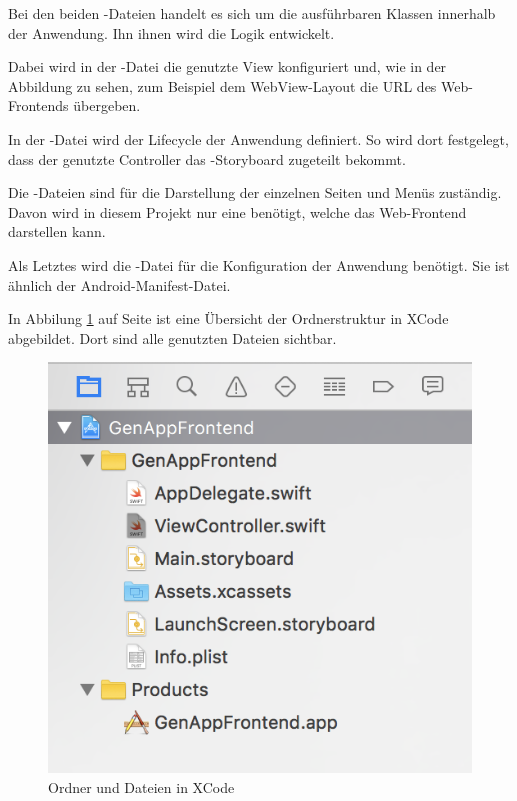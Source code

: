 Bei den beiden -Dateien handelt es sich um die ausführbaren Klassen innerhalb der Anwendung. Ihn ihnen wird
die Logik entwickelt.

Dabei wird in der -Datei die genutzte View konfiguriert und, wie in der Abbildung zu sehen, zum
Beispiel dem WebView-Layout die URL des Web-Frontends übergeben.

In der -Datei wird der Lifecycle der Anwendung definiert. So wird dort festgelegt, dass der genutzte
Controller das -Storyboard zugeteilt bekommt.

Die -Dateien sind für die Darstellung der einzelnen Seiten und Menüs zuständig. Davon wird in diesem
Projekt nur eine benötigt, welche das Web-Frontend darstellen kann.

Als Letztes wird die -Datei für die Konfiguration der Anwendung benötigt. Sie ist ähnlich der
Android-Manifest-Datei.

In Abbilung \ref{fig:xcode_folder} auf Seite \pageref{fig:xcode_folder} ist eine Übersicht der Ordnerstruktur in XCode
abgebildet. Dort sind alle genutzten Dateien sichtbar.

\begin{figure}[h]
 \centering
   \includegraphics[scale=1]{images/kapitel_4/xcode_folder.png}
 \caption{Ordner und Dateien in XCode}
 \label{fig:xcode_folder}
\end{figure}

